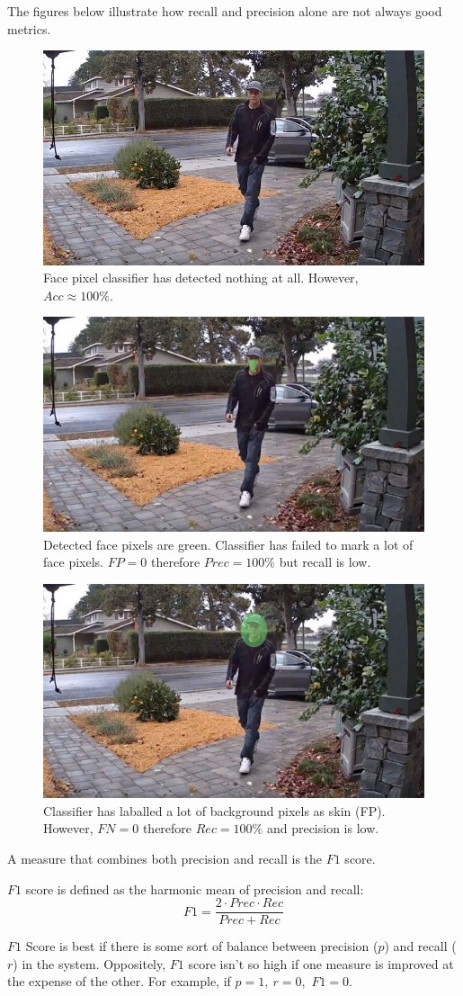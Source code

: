 \documentclass[a4paper]{article}
\begin{document}
The figures below illustrate how recall and precision alone are not always good metrics.

\begin{multicols}{3}
\begin{figure}[H]
    \centering
    \includegraphics[width=.33\textwidth]{img/face_unmarked.jpg}
    \caption{Face pixel classifier has detected nothing at all. However, $Acc \approx 100\%$.}
\end{figure}
\columnbreak
\begin{figure}[H]
    \centering
    \includegraphics[width=.33\textwidth]{img/face_fn.png}
    \caption{Detected face pixels are green. Classifier has failed to mark a lot of face pixels. $FP = 0$ therefore $Prec = 100\%$ but recall is low.}
\end{figure}
\columnbreak
\begin{figure}[H]
    \centering
    \includegraphics[width=.33\textwidth]{img/face_fp.png}
    \caption{Classifier has laballed a lot of background pixels as skin (FP). However, $FN = 0$ therefore $Rec = 100\%$ and precision is low.}
\end{figure}
\end{multicols}

A measure that combines both precision and recall is the $F1$ score.
\begin{definition}[f1 score]
$F1$ score is defined as the harmonic mean of precision and recall:
\begin{equation}
    F1 = \frac{2 \cdot Prec \cdot Rec}{Prec + Rec}
\end{equation}
\end{definition}
$F1$ Score is best if there is some sort of balance between precision ($p$) and recall ($r$) in the system. Oppositely, $F1$ score isn't so high if one measure is improved at the expense of the other. For example, if $p=1, \ r = 0$,\ $F1=0$.
\end{document}
